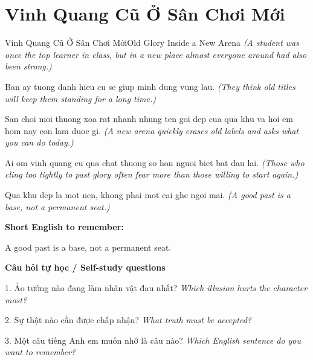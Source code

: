 \section{Vinh Quang Cũ Ở Sân Chơi Mới}
\begin{truyen}{Vinh Quang Cũ Ở Sân Chơi Mới}{Old Glory Inside a New Arena}
\textit{(A student was once the top learner in class, but in a new place almost everyone around had also been strong.)}

Ban ay tuong danh hieu cu se giup minh dung vung lau.
\textit{(They think old titles will keep them standing for a long time.)}

San choi moi thuong xoa rat nhanh nhung ten goi dep cua qua khu va hoi em hom nay con lam duoc gi.
\textit{(A new arena quickly erases old labels and asks what you can do today.)}

Ai om vinh quang cu qua chat thuong so hon nguoi biet bat dau lai.
\textit{(Those who cling too tightly to past glory often fear more than those willing to start again.)}

\end{truyen}

\begin{baihoc}
Qua khu dep la mot nen, khong phai mot cai ghe ngoi mai.
\textit{(A good past is a base, not a permanent seat.)}
\end{baihoc}

\begin{ghinhoanh}
\textbf{Short English to remember:}

A good past is a base, not a permanent seat.

\end{ghinhoanh}

\begin{tuhocnhanh}
\textbf{Câu hỏi tự học / Self-study questions}

1. Ảo tưởng nào đang làm nhân vật đau nhất? \textit{Which illusion hurts the character most?}

2. Sự thật nào cần được chấp nhận? \textit{What truth must be accepted?}

3. Một câu tiếng Anh em muốn nhớ là câu nào? \textit{Which English sentence do you want to remember?}
\end{tuhocnhanh}
\ngancach

